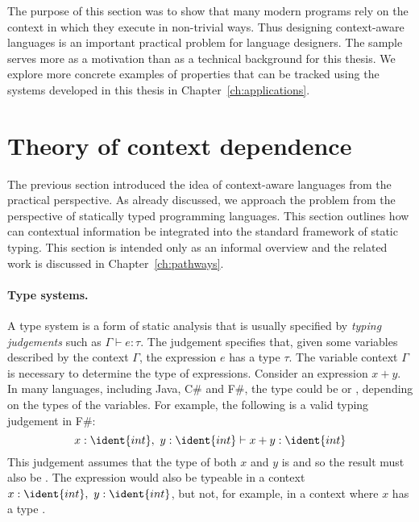 The purpose of this section was to show that many modern programs rely on the context in which 
they execute in non-trivial ways. Thus designing context-aware languages is an important 
practical problem for language designers. The sample serves more as a motivation than as a 
technical background for this thesis. We explore more concrete examples of properties that 
can be tracked using the systems developed in this thesis in Chapter~\ref{ch:applications}. 


\section{Theory of context dependence}

The previous section introduced the idea of context-aware languages from the practical perspective.
As already discussed, we approach the problem from the perspective of statically typed programming
languages. This section outlines how can contextual information be integrated into the 
standard framework of static typing. This section is intended only as an informal overview and the
related work is discussed in Chapter~\ref{ch:pathways}.

\paragraph{Type systems.}
A type system is a form of static analysis that is usually specified by \emph{typing judgements}
such as $\Gamma \vdash e : \tau$. The judgement specifies that, given some variables described by
the context $\Gamma$, the expression $e$ has a type $\tau$. 
The variable context $\Gamma$ is necessary to determine the type of expressions. Consider an 
expression $x + y$. In many languages, including Java, C\# and F\#, the type could be 
or , depending on the types of the variables. For example, the following is a valid
typing judgement in F\#:
%
\begin{equation*}
x\-:\-\ident{int},~y\-:\-\ident{int} \vdash x+y : \ident{int}
\end{equation*}
%
This judgement assumes that the type of both $x$ and $y$ is  and so the result must also
be . The expression would also be typeable in a context $x\-:\-\ident{int},~y\-:\-\ident{int}$,
but not, for example, in a context where $x$ has a type .

